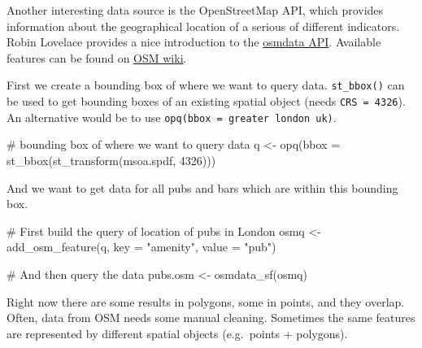 \documentclass[
  letterpaper,
]{scrbook}
\newenvironment{Shaded}{\begin{snugshade}}{\end{snugshade}}
\newcommand{\AttributeTok}[1]{\textcolor[rgb]{0.40,0.45,0.13}{#1}}
\newcommand{\CommentTok}[1]{\textcolor[rgb]{0.37,0.37,0.37}{#1}}
\newcommand{\DecValTok}[1]{\textcolor[rgb]{0.68,0.00,0.00}{#1}}
\newcommand{\FunctionTok}[1]{\textcolor[rgb]{0.28,0.35,0.67}{#1}}
\newcommand{\NormalTok}[1]{\textcolor[rgb]{0.00,0.23,0.31}{#1}}
\newcommand{\OtherTok}[1]{\textcolor[rgb]{0.00,0.23,0.31}{#1}}
\newcommand{\StringTok}[1]{\textcolor[rgb]{0.13,0.47,0.30}{#1}}
\begin{document}
Another interesting data source is the OpenStreetMap API, which provides
information about the geographical location of a serious of different
indicators. Robin Lovelace provides a nice introduction to the
\href{https://cran.r-project.org/web/packages/osmdata/vignettes/osmdata.html}{osmdata
API}. Available features can be found on
\href{https://wiki.openstreetmap.org/wiki/Map_features}{OSM wiki}.

First we create a bounding box of where we want to query data.
\texttt{st\_bbox()} can be used to get bounding boxes of an existing
spatial object (needs \texttt{CRS\ =\ 4326}). An alternative would be to
use
\texttt{opq(bbox\ =\ \textquotesingle{}greater\ london\ uk\textquotesingle{})}.

\begin{Shaded}
\begin{Highlighting}[]
\CommentTok{\# bounding box of where we want to query data}
\NormalTok{q }\OtherTok{\textless{}{-}} \FunctionTok{opq}\NormalTok{(}\AttributeTok{bbox =} \FunctionTok{st\_bbox}\NormalTok{(}\FunctionTok{st\_transform}\NormalTok{(msoa.spdf, }\DecValTok{4326}\NormalTok{)))}
\end{Highlighting}
\end{Shaded}

And we want to get data for all pubs and bars which are within this
bounding box.

\begin{Shaded}
\begin{Highlighting}[]
\CommentTok{\# First build the query of location of pubs in London}
\NormalTok{osmq }\OtherTok{\textless{}{-}} \FunctionTok{add\_osm\_feature}\NormalTok{(q, }\AttributeTok{key =} \StringTok{"amenity"}\NormalTok{, }\AttributeTok{value =} \StringTok{"pub"}\NormalTok{)}

\CommentTok{\# And then query the data}
\NormalTok{pubs.osm }\OtherTok{\textless{}{-}} \FunctionTok{osmdata\_sf}\NormalTok{(osmq)}
\end{Highlighting}
\end{Shaded}

Right now there are some results in polygons, some in points, and they
overlap. Often, data from OSM needs some manual cleaning. Sometimes the
same features are represented by different spatial objects (e.g.~points
+ polygons).
\end{document}
